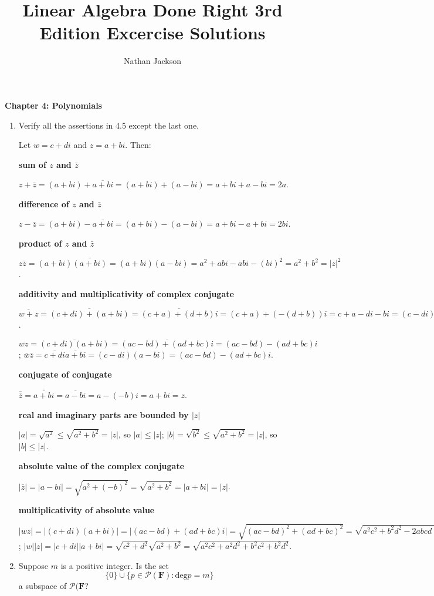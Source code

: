\documentclass{book}
\title{Linear Algebra Done Right 3rd Edition Excercise Solutions}
\author{Nathan Jackson}
\begin{document}
\textbf{Chapter 4: Polynomials}

\begin{enumerate}

\item Verify all the assertions in 4.5 except the last one.

Let \(w=c+di\) and \(z=a+bi\).  Then:

\textbf{sum of \(z\) and \(\bar{z}\)}

\(z+\bar{z} = (a+bi)+\overline{a+bi}=(a+bi)+(a-bi)=a+bi+a-bi=2a\).

\textbf{difference of \(z\) and \(\bar{z}\)}

\(z-\bar{z} = (a+bi)-\overline{a+bi}=(a+bi)-(a-bi)=a+bi-a+bi=2bi\).

\textbf{product of \(z\) and \(\bar{z}\)}

\(z\bar{z}=(a+bi)\overline{(a+bi)}=(a+bi)(a-bi)=a^2+abi-abi-(bi)^2=a^2+b^2=|z|^2\).

\textbf{additivity and multiplicativity of complex conjugate}

\(\overline{w+z}=\overline{(c+di)+(a+bi)}=\overline{(c+a)+(d+b)i}=(c+a)+(-(d+b))i=c+a-di-bi=(c-di)+(a-bi)=\overline{c+di}+\overline{a+bi}=\bar{w}+\bar{z}\).

\(\overline{wz}=\overline{(c+di)(a+bi)}=\overline{(ac-bd)+(ad+bc)i}=(ac-bd)-(ad+bc)i\); \(\bar{w}\bar{z}=\overline{c+di}\overline{a+bi}=(c-di)(a-bi)=(ac-bd)-(ad+bc)i\).

\textbf{conjugate of conjugate}

\(\overline{\bar{z}}=\overline{\overline{a+bi}}=\overline{a-bi}=a-(-b)i=a+bi=z\).

\textbf{real and imaginary parts are bounded by \(|z|\)}

\(|a| = \sqrt{a^2} \leq \sqrt{a^2+b^2} = |z|\), so \(|a| \leq |z|\); \(|b| = \sqrt{b^2} \leq \sqrt{a^2+b^2} = |z|\), so \(|b| \leq |z|\).

\textbf{absolute value of the complex conjugate}

\(|\bar{z}|=|a-bi|=\sqrt{a^2+(-b)^2}=\sqrt{a^2+b^2}=|a+bi|=|z|\).

\textbf{multiplicativity of absolute value}

\(|wz|=|(c+di)(a+bi)|=|(ac-bd)+(ad+bc)i|=\sqrt{(ac-bd)^2+(ad+bc)^2}=\sqrt{a^2c^2+b^2d^2-2abcd+a^2d^2+b^2c^2+2abcd}=\sqrt{a^2c^2+a^2d^2+b^2c^2+b^2d^2}\); \(|w||z|=|c+di||a+bi|=\sqrt{c^2+d^2}\sqrt{a^2+b^2}=\sqrt{a^2c^2+a^2d^2+b^2c^2+b^2d^2}\).

\item Suppose \(m\) is a positive integer.  Is the set \[\{0\} \cup \{p \in \mathcal{P}(\textbf{F}): \textrm{deg}p = m\}\] a subspace of \(\mathcal{P}(\textbf{F}\)?


\end{enumerate}
\end{document}
